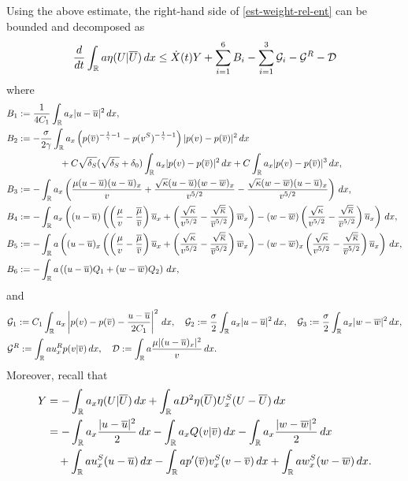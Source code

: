 \documentclass[11pt,reqno]{amsart}
\begin{document}
    Using the above estimate, the right-hand side of \eqref{est-weight-rel-ent} can be bounded and decomposed as
    \begin{equation}\label{est-1}
    \frac{d}{dt}\int_{\mathbb R}a\eta(U|\overline{U})\,dx \le \dot{X}(t) Y + \sum_{i=1}^6 B_i-\sum_{i=1}^3 \mathcal{G}_i - \mathcal{G}^R - \mathcal{D}
    \end{equation}
  where
    \begin{align*}
    &B_1 :=\frac{1}{4 C_1} \int_\mathbb{R} a_x  |u-\overline{u}|^2 \, dx,\\
    &B_2:= -\frac{\sigma}{2\gamma}\int_\mathbb{R} a_x \left( p(\overline{v})^{-\frac{1}{\gamma}-1} -p(v^S)^{-\frac{1}{\gamma}-1} \right) |p(v)-p(\overline{v})|^2\, dx \\
    &\hspace{2cm} + C\sqrt{\delta_S}(\sqrt{\delta_S}+\delta_0) \int_{\mathbb{R}} a_x|p(v)-p(\overline{v})|^2 \, d x 
    +C\int_{\mathbb{R}} a_x|p(v)-p(\overline{v})|^3 \, d x,\\
    &B_3:=-\int_\mathbb{R} a_x \left( \frac{ \mu (u-\overline{u})  (u-\overline{u})_x}{v}+  \frac{\sqrt{\kappa}  (u-\overline{u}) (w-\overline{w})_x }{v^{5/2}} -  \frac{\sqrt{\kappa} (w-\overline{w}) (u-\overline{u})_x}{v^{5/2}}\right) \, dx, \\
    &B_4:=-\int_\mathbb{R} a_x \left( (u-\overline{u}) \left(\left( \frac{\mu}{v}-\frac{\overline{\mu}}{\overline{v}} \right) \overline{u}_x+  \left( \frac{\sqrt{\kappa}}{v^{5/2}}-\frac{\sqrt{\overline{\kappa}}}{\overline{v}^{5/2}} \right) \overline{w}_x \right) -(w-\overline{w})  \left( \frac{\sqrt{\kappa}}{v^{5/2}}-\frac{\sqrt{\overline{\kappa}}}{\overline{v}^{5/2}} \right) \overline{u}_x \right) \, dx, \\
    &B_5:=-\int_\mathbb{R} a \left( (u-\overline{u})_x\left(\left( \frac{\mu}{v}-\frac{\overline{\mu}}{\overline{v}} \right) \overline{u}_x + \left( \frac{\sqrt{\kappa}}{v^{5/2}}-\frac{\sqrt{\overline{\kappa}}}{\overline{v}^{5/2}} \right) \overline{w}_x\right)-(w-\overline{w})_x \left( \frac{\sqrt{\kappa}}{v^{5/2}}-\frac{\sqrt{\overline{\kappa}}}{\overline{v}^{5/2}} \right) \overline{u}_x\right) \, dx, \\
   &B_6:=-\int_\mathbb{R} a \left( (u-\overline{u}) Q_1 + (w-\overline{w}) Q_2 \right) \, dx,
    \end{align*} 
and
    \begin{align*}
    &\mathcal{G}_1:=C_1 \int_\mathbb{R} a_x \left|p(v)-p(\overline{v})-\frac{u-\overline{u}}{2C_1} \right|^2 \, d x, \quad \mathcal{G}_2:=\frac{\sigma}{2} \int_\mathbb{R} a_x |u-\overline{u}|^2  \, dx,\quad \mathcal{G}_3:=\frac{\sigma}{2} \int_\mathbb{R} a_x |w-\overline{w}|^2 \, dx,\\
    &\mathcal{G}^R:=\int_\mathbb{R} a u^R_x p(v|\overline{v}) \, dx,\quad \mathcal{D}:=  \int_\mathbb{R} a \frac{\mu |(u-\overline{u})_x|^2}{v} \,dx.
    \end{align*}
    Moreover, recall that
    \begin{align*}
    Y&=-\int_{\mathbb R} a_x \eta(U|\overline{U})\,dx +\int_\mathbb R a D^2\eta(\overline{U})U^S_x(U-\overline{U})\,dx\\
    & = -\int_{\mathbb R} a_x \frac{|u-\overline{u}|^2}{2} \, dx -\int_\mathbb{R} a_x Q(v|\overline{v})\, dx -\int_\mathbb{R} a_x\frac{|w-\overline{w}|^2}{2}\,dx \\ 
    &\quad +\int_{\mathbb R} a u^S_x (u-\overline{u})\,dx -\int_{\mathbb R} a p'(\overline{v})v^S_x (v-\overline{v})\,dx+\int_\mathbb{R} a w^S_x(w-\overline{w}) \, dx.
    \end{align*}
\end{document}
